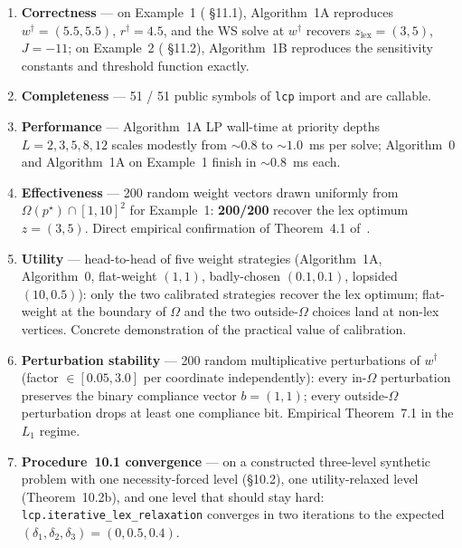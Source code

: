 \documentclass[journal, twocolumn]{IEEEtran}
\begin{document}
\begin{enumerate}[leftmargin=*,noitemsep]
\item \textbf{Correctness} --- on Example~1 (\cite{lcp2025} \S11.1), Algorithm~1A reproduces $w^\dagger = (5.5, 5.5)$, $r^\dagger = 4.5$, and the WS solve at $w^\dagger$ recovers $z_{\mathrm{lex}} = (3, 5)$, $J = -11$; on Example~2 (\cite{lcp2025} \S11.2), Algorithm~1B reproduces the sensitivity constants and threshold function exactly.

\item \textbf{Completeness} --- 51 / 51 public symbols of \texttt{lcp} import and are callable.

\item \textbf{Performance} --- Algorithm~1A LP wall-time at priority depths $L = 2, 3, 5, 8, 12$ scales modestly from $\sim 0.8$ to $\sim 1.0$~ms per solve; Algorithm~0 and Algorithm~1A on Example~1 finish in $\sim 0.8$~ms each.

\item \textbf{Effectiveness} --- 200 random weight vectors drawn uniformly from $\Omega(p^\star) \cap [1, 10]^2$ for Example~1: \textbf{200/200} recover the lex optimum $z = (3, 5)$. Direct empirical confirmation of Theorem~4.1 of~\cite{lcp2025}.

\item \textbf{Utility} --- head-to-head of five weight strategies (Algorithm~1A, Algorithm~0, flat-weight $(1, 1)$, badly-chosen $(0.1, 0.1)$, lopsided $(10, 0.5)$): only the two calibrated strategies recover the lex optimum; flat-weight at the boundary of $\Omega$ and the two outside-$\Omega$ choices land at non-lex vertices. Concrete demonstration of the practical value of calibration.

\item \textbf{Perturbation stability} --- 200 random multiplicative perturbations of $w^\dagger$ (factor $\in [0.05, 3.0]$ per coordinate independently): every in-$\Omega$ perturbation preserves the binary compliance vector $b = (1, 1)$; every outside-$\Omega$ perturbation drops at least one compliance bit. Empirical Theorem~7.1 in the $L_1$ regime.

\item \textbf{Procedure~10.1 convergence} --- on a constructed three-level synthetic problem with one necessity-forced level (\S10.2), one utility-relaxed level (Theorem~10.2b), and one level that should stay hard: \texttt{lcp.iterative\_lex\_relaxation} converges in two iterations to the expected $(\delta_1, \delta_2, \delta_3) = (0, 0.5, 0.4)$.
\end{enumerate}
\end{document}
